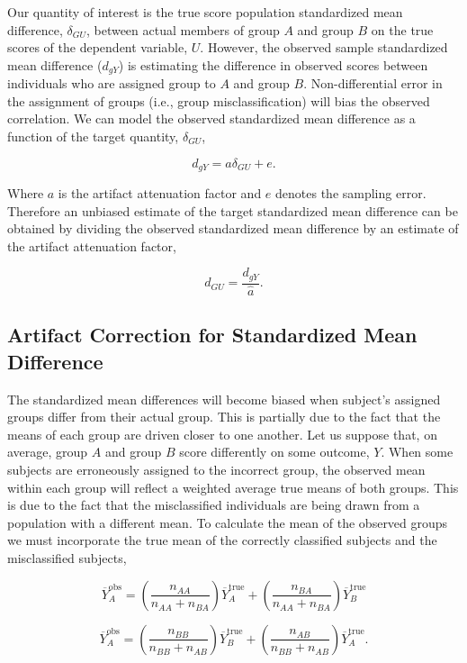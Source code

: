 \documentclass[
  letterpaper,
  DIV=11,
  numbers=noendperiod]{scrreprt}
\begin{document}
Our quantity of interest is the true score population standardized mean
difference, \(\delta_{GU}\), between actual members of group \(A\) and
group \(B\) on the true scores of the dependent variable, \(U\).
However, the observed sample standardized mean difference (\(d_{gY}\))
is estimating the difference in observed scores between individuals who
are assigned group to \(A\) and group \(B\). Non-differential error in
the assignment of groups (i.e., group misclassification) will bias the
observed correlation. We can model the observed standardized mean
difference as a function of the target quantity, \(\delta_{GU}\),

\[
d_{gY} = a\delta_{GU} + e.
\]

Where \(a\) is the artifact attenuation factor and \(e\) denotes the
sampling error. Therefore an unbiased estimate of the target
standardized mean difference can be obtained by dividing the observed
standardized mean difference by an estimate of the artifact attenuation
factor,

\[
d_{GU} = \frac{d_{gY}}{\hat{a}}.
\]

\subsection{Artifact Correction for Standardized Mean
Difference}\label{artifact-correction-for-standardized-mean-difference}

The standardized mean differences will become biased when subject's
assigned groups differ from their actual group. This is partially due to
the fact that the means of each group are driven closer to one another.
Let us suppose that, on average, group \(A\) and group \(B\) score
differently on some outcome, \(Y\). When some subjects are erroneously
assigned to the incorrect group, the observed mean within each group
will reflect a weighted average true means of both groups. This is due
to the fact that the misclassified individuals are being drawn from a
population with a different mean. To calculate the mean of the observed
groups we must incorporate the true mean of the correctly classified
subjects and the misclassified subjects,

\[
\overline{Y}^\text{obs}_A = \left(\frac{n_{AA}}{n_{AA}+n_{BA}}\right)\overline{Y}^\text{true}_A + \left(\frac{n_{BA}}{n_{AA}+n_{BA}}\right)\overline{Y}^\text{true}_B
\]

\[
\overline{Y}^\text{obs}_A = \left(\frac{n_{BB}}{n_{BB}+n_{AB}}\right)\overline{Y}^\text{true}_B + \left(\frac{n_{AB}}{n_{BB}+n_{AB}}\right)\overline{Y}^\text{true}_A.
\]
\end{document}

